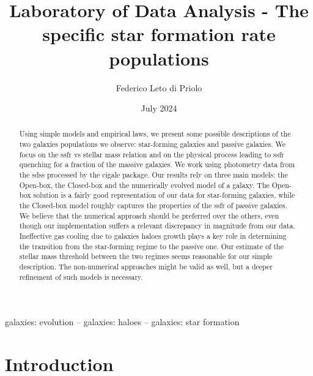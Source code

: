 \documentclass[fleqn, usenatbib]{mnras}
\title[Laboratory of Data Analysis]{Laboratory of Data Analysis - The specific star formation rate populations}
\author[F. Leto di Priolo]{
Federico Leto di Priolo}
\date{July 2024}
\begin{document}
\maketitle

\begin{abstract}
	Using simple models and empirical laws, we present some possible descriptions of the two galaxies populations we observe: star-forming galaxies and passive galaxies. We focus on the \acrfull{ssfr} vs stellar mass relation and on the physical process leading to \acrshort{ssfr} quenching for a fraction of the massive galaxies. We work using photometry data from the \acrfull{sdss} processed by the \acrfull{cigale} package. Our results rely on three main models: the Open-box, the Closed-box and the numerically evolved model of a galaxy. The Open-box solution is a fairly good representation of our data for star-forming galaxies, while the Closed-box model roughly captures the properties of the \acrshort{ssfr} of passive galaxies. We believe that the numerical approach should be preferred over the others, even though our implementation suffers a relevant discrepancy in magnitude from our data. Ineffective gas cooling due to galaxies haloes growth plays a key role in determining the transition from the star-forming regime to the passive one. Our estimate of the stellar mass threshold between the two regimes seems reasonable for our simple description. The non-numerical approaches might be valid as well, but a deeper refinement of such models is necessary.
\end{abstract}

\begin{keywords}
	galaxies: evolution -- galaxies: haloes -- galaxies: star formation
\end{keywords}



\section{Introduction}
\end{document}
